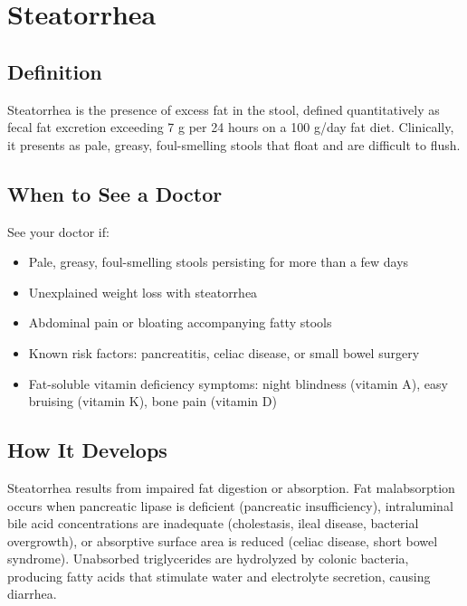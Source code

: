 \chapter{Steatorrhea}

\section*{Definition}
Steatorrhea is the presence of excess fat in the stool, defined quantitatively as fecal fat excretion exceeding 7 g per 24 hours on a 100 g/day fat diet. Clinically, it presents as pale, greasy, foul-smelling stools that float and are difficult to flush.

\section*{When to See a Doctor}
See your doctor if:
\begin{itemize}
  \item Pale, greasy, foul-smelling stools persisting for more than a few days
  \item Unexplained weight loss with steatorrhea
  \item Abdominal pain or bloating accompanying fatty stools
  \item Known risk factors: pancreatitis, celiac disease, or small bowel surgery
  \item Fat-soluble vitamin deficiency symptoms: night blindness (vitamin A), easy bruising (vitamin K), bone pain (vitamin D)
\end{itemize}

\section*{How It Develops}
Steatorrhea results from impaired fat digestion or absorption. Fat malabsorption occurs when pancreatic lipase is deficient (pancreatic insufficiency), intraluminal bile acid concentrations are inadequate (cholestasis, ileal disease, bacterial overgrowth), or absorptive surface area is reduced (celiac disease, short bowel syndrome). Unabsorbed triglycerides are hydrolyzed by colonic bacteria, producing fatty acids that stimulate water and electrolyte secretion, causing diarrhea.

